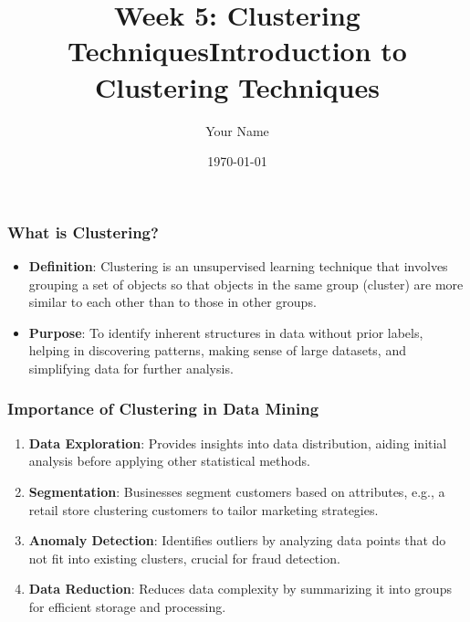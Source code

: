 \documentclass{beamer}
\title{Week 5: Clustering Techniques}
\author{Your Name}
\institute{Your Institution}
\date{\today}
\begin{document}
\frame{\titlepage}

\begin{frame}
    \title{Introduction to Clustering Techniques}
    \maketitle
\end{frame}

\begin{frame}
    \frametitle{What is Clustering?}
    \begin{itemize}
        \item \textbf{Definition}: Clustering is an unsupervised learning technique that involves grouping a set of objects so that objects in the same group (cluster) are more similar to each other than to those in other groups.
        \item \textbf{Purpose}: To identify inherent structures in data without prior labels, helping in discovering patterns, making sense of large datasets, and simplifying data for further analysis.
    \end{itemize}
\end{frame}

\begin{frame}
    \frametitle{Importance of Clustering in Data Mining}
    \begin{enumerate}
        \item \textbf{Data Exploration}: Provides insights into data distribution, aiding initial analysis before applying other statistical methods.
        \item \textbf{Segmentation}: Businesses segment customers based on attributes, e.g., a retail store clustering customers to tailor marketing strategies.
        \item \textbf{Anomaly Detection}: Identifies outliers by analyzing data points that do not fit into existing clusters, crucial for fraud detection.
        \item \textbf{Data Reduction}: Reduces data complexity by summarizing it into groups for efficient storage and processing.
    \end{enumerate}
\end{frame}
\end{document}
